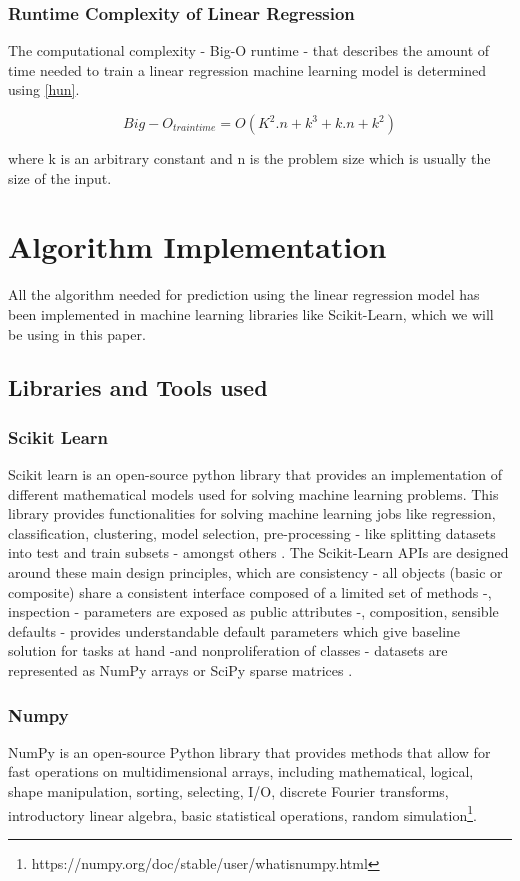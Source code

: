 \documentclass[conference]{IEEEtran}
\begin{document}
\subsubsection{Runtime Complexity of Linear Regression}
The computational complexity - Big-O runtime - that describes the amount of time needed to train a linear regression machine learning model is determined using \eqref{hun}.

	\begin{equation}
		Big-O_{train time} = \label{hun}O(K^2.n + k^3 + k.n + k^2) 
	\end{equation}
	
	where k  is an arbitrary constant and n is the problem size which is usually the size of the input.
	
\section{Algorithm Implementation}
All the algorithm needed for prediction using the linear regression model has been implemented in machine learning libraries like Scikit-Learn, which we will be using in this paper.
\subsection{Libraries and Tools used}
\subsubsection{Scikit Learn}
Scikit learn is an open-source python library that provides an implementation of different mathematical models used for solving machine learning problems. This library provides functionalities for solving machine learning jobs like regression, classification, clustering, model selection, pre-processing - like splitting datasets into test and train subsets - amongst others \cite{scikit_learn}. The Scikit-Learn APIs are designed around these main design principles, which are consistency - all objects (basic or composite) share a consistent interface composed of a limited set of methods -, inspection - parameters are exposed as public attributes -, composition, sensible defaults - provides understandable default parameters which give baseline solution for tasks at hand -and nonproliferation of classes - datasets are represented as NumPy arrays or SciPy sparse matrices \cite{sklearn_api}.
\subsubsection{Numpy}
NumPy is an open-source Python library that provides methods that allow for fast operations on multidimensional arrays, including mathematical, logical, shape manipulation, sorting, selecting, I/O, discrete Fourier transforms, introductory linear algebra, basic statistical operations, random simulation\footnote{https://numpy.org/doc/stable/user/whatisnumpy.html}.
\end{document}
